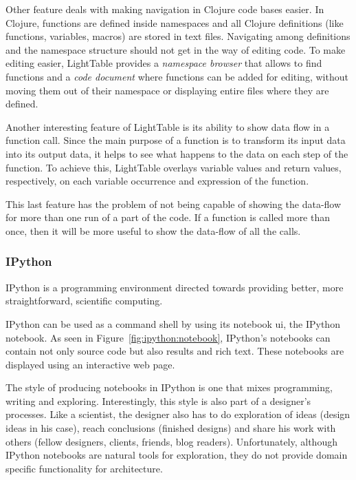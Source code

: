 Other feature deals with making navigation in Clojure code bases easier.
In Clojure, functions are defined inside namespaces and all Clojure definitions (like functions, variables, macros) are stored in text files.
Navigating among definitions and the namespace structure should not get in the way of editing code.
To make editing easier, LightTable provides a \emph{namespace browser} that allows to find functions and a \emph{code document} where functions can be added for editing, without moving them out of their namespace or displaying entire files where they are defined.

Another interesting feature of LightTable is its ability to show data flow in a function call.
Since the main purpose of a function is to transform its input data into its output data, it helps to see what happens to the data on each step of the function.
To achieve this, LightTable overlays variable values and return values, respectively, on each variable occurrence and expression of the function.

This last feature has the problem of not being capable of showing the data-flow for more than one run of a part of the code.
If a function is called more than once, then it will be more useful to show the data-flow of all the calls.


\subsubsection{IPython}
\label{section:ipython:related}
IPython\cite{PER-GRA:2007} is a programming environment directed towards providing better, more straightforward, scientific computing.

IPython can be used as a command shell by using its notebook \gls{ui}, the IPython notebook.
As seen in Figure~\ref{fig:ipython:notebook}, IPython's notebooks can contain not only source code but also results and rich text.
These notebooks are displayed using an interactive web page.

The style of producing notebooks in IPython is one that mixes programming, writing and exploring.
Interestingly, this style is also part of a designer's processes.
Like a scientist, the designer also has to do exploration of ideas (design ideas in his case), reach conclusions (finished designs) and share his work with others (fellow designers, clients, friends, blog readers).
Unfortunately, although IPython notebooks are natural tools for exploration, they do not provide domain specific functionality for architecture.

